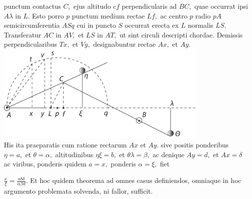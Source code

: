 punctum contactus $C,$ ejus altitudo $cf$
perpendicularis ad $BC,$ quae occurrat ipsi $A\lambda$ in $L.$ Esto porro $p$ punctum medium rectae $Lf,$ ac centro $p$ radio $pA$ 
semicircumferentia $ASq$ cui in puncto $S$ occurrat erecta ex $L$ normalis $LS.$ Transferatur $AC$ in $AV,$ et $LS$ in $AT,$ ut sint circuli descripti chordae. Demissis
perpendicularibus $Tx,$ et $Vy,$ designabuntur rectae $Ax,$ et $Ay.$
\pend
\vspace{2em}
\pstart
\centering
\includegraphics[width=0.78\textwidth]{images/LH037,03_079r-d1.pdf}\\
\pend
\newpage
\pstart
His ita praeparatis 
cum ratione rectarum $Ax$ et $Ay$. sive positis ponderibus\protect{} $\eta=a,$ et $\theta=\alpha,$ altitudinibus $\eta\xi=b,$ et $\theta\lambda=\beta,$ ac denique $Ay=d,$ et $Ax=\delta$ ac viribus, ponderis\protect{} quidem $a=x,$ ponderis\protect{}
\edtext{vero}{\lemma{}\Bfootnote{vero \textit{erg.} \textit{L}}}
$\alpha=\xi,$ fiet \rule[-4mm]{0mm}{10mm}$\displaystyle\frac{x}{\xi}=\frac{ab\delta}{\alpha\beta d}.$
\pend
\pstart
Et hoc quidem theorema\protect{} ad omnes casus definiendos, omniaque in hoc argumento problemata\protect{} solvenda, ni fallor, sufficit.
\pend
\count{}
\count{}
\count{}